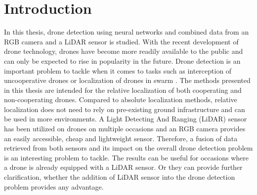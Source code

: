 \documentclass[twoside]{ctuthesis}
\theoremstyle{plain}
\theoremstyle{definition}
\theoremstyle{note}
\begin{document}
\maketitle
\chapter{Introduction}
In this thesis, drone detection using neural networks and combined data from an RGB camera and a LiDAR sensor is studied. With the recent development of drone technology, drones have become more readily available to the public and can only be expected to rise in popularity in the future. Drone detection is an important problem to tackle when it comes to tasks such as interception of uncooperative drones \cite{cite:1} or localization of drones in swarm \cite{cite:2} \cite{cite:3}. The methods presented in this thesis are intended for the relative localization of both cooperating and non-cooperating drones. Compared to absolute localization methods, relative localization does not need to rely on pre-existing ground infrastructure and can be used in more environments. A Light Detecting And Ranging (LiDAR) sensor has been utilized on drones on multiple occasions \cite{cite:4} \cite{9553611} \cite{9554023} and an RGB camera provides an easily accessible, cheap and lightweight sensor. Therefore, a fusion of data retrieved from both sensors and its impact on the overall drone detection problem is an interesting problem to tackle. The results can be useful for occasions where a drone is already equipped with a LiDAR sensor. Or they can provide further clarification, whether the addition of LiDAR sensor into the drone detection problem provides any advantage.
\end{document}
